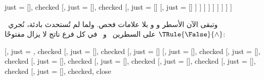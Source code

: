 \documentclass[../../../include/open-logic-section]{subfiles}
\begin{document}
{\begin{ex}
\begin{oltableau}
                just = {\TRule{\True}{\Diamond}[]}, checked
                [, 
                  just = {\TRule{\True}{\Diamond}[]}, checked
                  [, 
                    just = {\TRule{\False}{\Diamond}[]}
                    [, 
                      just = {\TRule{\False}{\Diamond}[]}
                    ]
                  ]
                ]
              ]
            ]
          ]
        ]
      ]
    ]
  \end{oltableau}
  وتبقى الآن الأسطر  و و بلا علامات فحص. ولما لم تُستحدث بادئة،
  نُجري~$\TRule{\False}{\land}$ على السطرين~ و~ في كل فرع
  ناتج لا يزال مفتوحًا:
  \begin{oltableau}
    [,
      just = \TAss, checked
      [,
        just = {\TRule{\False}{\lif}[]}, checked
        [,
          just = {\TRule{\False}{\lif}[]}
          [,
            just = {\TRule{\True}{\land}[]}, checked
            [,
              just = {\TRule{\True}{\land}[]}, checked
              [, 
                just = {\TRule{\True}{\Diamond}[]}, checked
                [, 
                  just = {\TRule{\True}{\Diamond}[]}, checked
                  [, 
                    just = {\TRule{\False}{\Diamond}[]}, checked
                    [, 
                      just = {\TRule{\False}{\Diamond}[]}, checked
                      [,
                        just = {\TRule{\False}{\land}[]}, checked, close

\end{oltableau}
\end{ex}}
\end{document}
